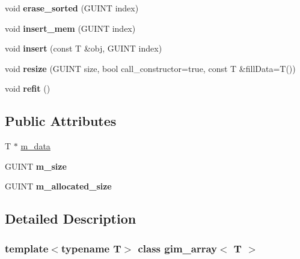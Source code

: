 \begin{DoxyCompactItemize}
void {\bfseries erase\+\_\+sorted} (G\+U\+I\+NT index)
\item 
\mbox{\label{classgim__array_ad136c0af14df7e2943e437be26edda29}} 
void {\bfseries insert\+\_\+mem} (G\+U\+I\+NT index)
\item 
\mbox{\label{classgim__array_aa1855162e3317aead1e20dfe895dfe5c}} 
void {\bfseries insert} (const T \&obj, G\+U\+I\+NT index)
\item 
\mbox{\label{classgim__array_aa4a78ae4cec9771904e3b461c494431a}} 
void {\bfseries resize} (G\+U\+I\+NT size, bool call\+\_\+constructor=true, const T \&fill\+Data=T())
\item 
\mbox{\label{classgim__array_adee8674335c3f49686fffe144cca6deb}} 
void {\bfseries refit} ()
\end{DoxyCompactItemize}

\subsection*{Public Attributes}
\textbf{ }\par
\begin{DoxyCompactItemize}
\item 
T $\ast$ \hyperlink{classgim__array_a0ac4ef950a94175dd3b5013c2a4a11a3}{m\+\_\+data}
\item 
\mbox{\label{classgim__array_a2cf2f444d6ce2cf6262d20d1d3c49278}} 
G\+U\+I\+NT {\bfseries m\+\_\+size}
\item 
\mbox{\label{classgim__array_abd86b4cd0d2dcc03d13505f02e950752}} 
G\+U\+I\+NT {\bfseries m\+\_\+allocated\+\_\+size}
\end{DoxyCompactItemize}



\subsection{Detailed Description}
\subsubsection*{template$<$typename T$>$\newline
class gim\+\_\+array$<$ T $>$}

